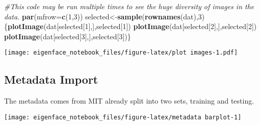 \documentclass[]{article}
\newenvironment{Shaded}{\begin{snugshade}}{\end{snugshade}}
\newcommand{\KeywordTok}[1]{\textcolor[rgb]{0.13,0.29,0.53}{\textbf{#1}}}
\newcommand{\DataTypeTok}[1]{\textcolor[rgb]{0.13,0.29,0.53}{#1}}
\newcommand{\DecValTok}[1]{\textcolor[rgb]{0.00,0.00,0.81}{#1}}
\newcommand{\StringTok}[1]{\textcolor[rgb]{0.31,0.60,0.02}{#1}}
\newcommand{\CommentTok}[1]{\textcolor[rgb]{0.56,0.35,0.01}{\textit{#1}}}
\newcommand{\OperatorTok}[1]{\textcolor[rgb]{0.81,0.36,0.00}{\textbf{#1}}}
\newcommand{\NormalTok}[1]{#1}
\begin{document}
\begin{Shaded}
\begin{Highlighting}[]
\CommentTok{#This code may be run multiple times to see the huge diversity of images in the data.}
\KeywordTok{par}\NormalTok{(}\DataTypeTok{mfrow=}\KeywordTok{c}\NormalTok{(}\DecValTok{1}\NormalTok{,}\DecValTok{3}\NormalTok{))}
\NormalTok{selected<-}\KeywordTok{sample}\NormalTok{(}\KeywordTok{rownames}\NormalTok{(dat),}\DecValTok{3}\NormalTok{)}
\NormalTok{\{}\KeywordTok{plotImage}\NormalTok{(dat[selected[}\DecValTok{1}\NormalTok{],],selected[}\DecValTok{1}\NormalTok{])}
\KeywordTok{plotImage}\NormalTok{(dat[selected[}\DecValTok{2}\NormalTok{],],selected[}\DecValTok{2}\NormalTok{])}
\KeywordTok{plotImage}\NormalTok{(dat[selected[}\DecValTok{3}\NormalTok{],],selected[}\DecValTok{3}\NormalTok{])\}}
\end{Highlighting}
\end{Shaded}

\texttt{[image: eigenface\_notebook\_files/figure-latex/plot images-1.pdf]}

\subsection{Metadata Import}\label{metadata-import}

The metadata comes from MIT already split into two sets, training and
testing.

\begin{Shaded}
\end{Shaded}

\begin{center}\texttt{[image: eigenface\_notebook\_files/figure-latex/metadata barplot-1]} \end{center}
\end{document}
